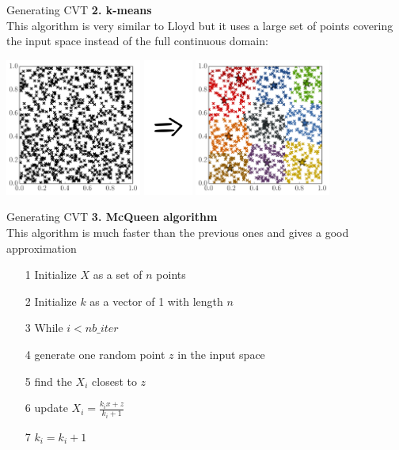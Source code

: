 \documentclass{beamer}
\begin{document}
\begin{frame}{Generating CVT }
\textbf{2. k-means}\\
This algorithm is very similar to Lloyd but it uses a large set of points covering the input space instead of the full continuous domain:
\begin{center}
\includegraphics[height=4.5cm]{figures/python/spf_kmeans1}
\includegraphics[height=4.5cm]{figures/Rightarrow}
\includegraphics[height=4.5cm]{figures/python/spf_kmeans2}
\end{center}
\end{frame}

\begin{frame}{Generating CVT }
\textbf{3. McQueen algorithm}\\
\vspace{5mm}
This algorithm is much faster than the previous ones and gives a good approximation
\begin{itemize}
	\item[1] Initialize $X$ as a set of $n$ points
	\item[2] Initialize $k$ as a vector of 1 with length $n$
	\item[3] While $i<nb\_iter$ 
	\item[4] \qquad generate one random point $z$ in the input space
	\item[5] \qquad find the $X_i$ closest to $z$
	\item[6] \qquad update $X_i = \frac{k_i x + z}{k_i+1}$
	\item[7] \qquad $k_i =k_i+1$
\end{itemize}
\end{frame}
\end{document}
